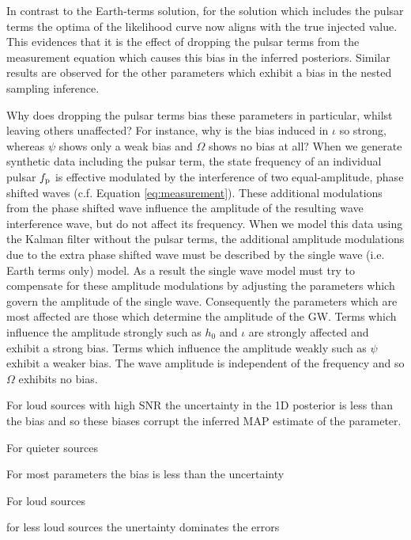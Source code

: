 \documentclass[fleqn,usenatbib,useAMS]{mnras}
\begin{document}
In contrast to the Earth-terms solution, for the solution which includes the pulsar terms the optima of the likelihood curve now aligns with the true injected value. This evidences that it is the effect of dropping the pulsar terms from the measurement equation which causes this bias in the inferred posteriors. Similar results are observed for the other parameters which exhibit a bias in the nested sampling inference. \newline 



Why does dropping the pulsar terms bias these parameters in particular, whilst leaving others unaffected? For instance, why is the bias induced in $\iota$ so strong, whereas $\psi$ shows only a weak bias and  $\Omega$ shows no bias at all? When we generate synthetic data including the pulsar term, the state frequency of an individual pulsar $f_{\rm p}$ is effective modulated by the interference of two equal-amplitude, phase shifted waves (c.f. Equation \ref{eq:measurement}). These additional modulations from the phase shifted wave influence the amplitude of the resulting wave interference wave, but do not affect its frequency. When we model this data using the Kalman filter without the pulsar terms, the additional amplitude modulations due to the extra phase shifted wave must be described by the single wave (i.e. Earth terms only) model. As a result the single wave model must try to compensate for these amplitude modulations by adjusting the parameters which govern the amplitude of the single wave. Consequently the parameters which are most affected are those which determine the amplitude of the GW. Terms which influence the amplitude strongly such as $h_0$ and $\iota$ are strongly affected and exhibit a strong bias. Terms which influence the amplitude weakly such as $\psi$ exhibit a weaker bias. The wave amplitude is independent of the frequency and so $\Omega$ exhibits no bias.




For loud sources with high SNR the uncertainty in the 1D posterior is less than the bias and so these biases corrupt the inferred MAP estimate of the parameter.


For quieter sources 





For most parameters the bias is less than the uncertainty

For loud sources

for less loud sources the unertainty dominates the errors 
\end{document}
